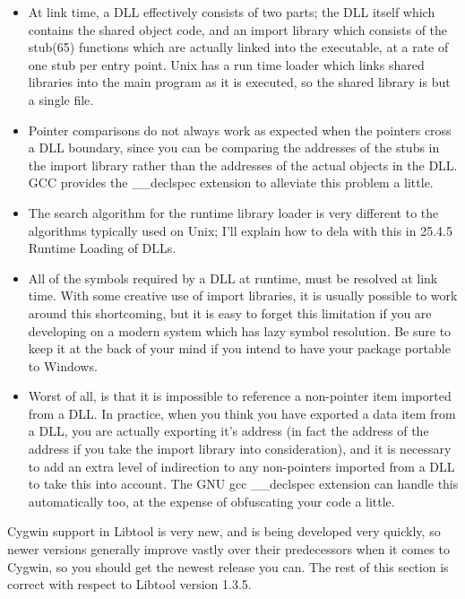 \begin{itemize}
\item At link time, a DLL effectively consists of two parts; the DLL itself which contains the shared object code, and an import library which consists of the stub(65) functions which are actually linked into the executable, at a rate of one stub per entry point. Unix has a run time loader which links shared libraries into the main program as it is executed, so the shared library is but a single file.

\item Pointer comparisons do not always work as expected when the pointers cross a DLL boundary, since you can be comparing the addresses of the stubs in the import library rather than the addresses of the actual objects in the DLL. GCC provides the \_{}\_{}declspec extension to alleviate this problem a little.

\item The search algorithm for the runtime library loader is very different to the algorithms typically used on Unix; I'll explain how to dela with this in 25.4.5 Runtime Loading of DLLs.

\item All of the symbols required by a DLL at runtime, must be resolved at link time. With some creative use of import libraries, it is usually possible to work around this shortcoming, but it is easy to forget this limitation if you are developing on a modern system which has lazy symbol resolution. Be sure to keep it at the back of your mind if you intend to have your package portable to Windows.

\item Worst of all, is that it is impossible to reference a non-pointer item imported from a DLL. In practice, when you think you have exported a data item from a DLL, you are actually exporting it's address (in fact the address of the address if you take the import library into consideration), and it is necessary to add an extra level of indirection to any non-pointers imported from a DLL to take this into account. The GNU gcc \_{}\_{}declspec extension can handle this automatically too, at the expense of obfuscating your code a little.
\end{itemize}

Cygwin support in Libtool is very new, and is being developed very quickly, so newer versions generally improve vastly over their predecessors when it comes to Cygwin, so you should get the newest release you can. The rest of this section is correct with respect to Libtool version 1.3.5.

